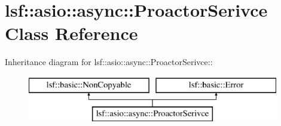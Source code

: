 \hypertarget{classlsf_1_1asio_1_1async_1_1ProactorSerivce}{
\section{lsf::asio::async::ProactorSerivce Class Reference}
\label{classlsf_1_1asio_1_1async_1_1ProactorSerivce}
}
Inheritance diagram for lsf::asio::async::ProactorSerivce::\begin{figure}[H]
\begin{center}
\leavevmode
\includegraphics[height=2cm]{classlsf_1_1asio_1_1async_1_1ProactorSerivce}
\end{center}
\end{figure}

